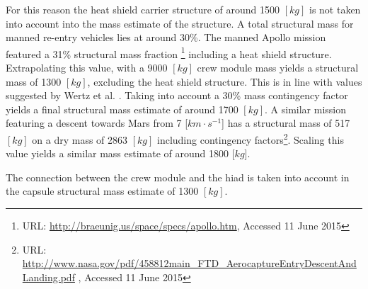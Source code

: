 For this reason the heat shield carrier structure of around 1500 $[kg]$ \cite{Ainsworth2014} is not taken into account into the mass estimate of the structure. A total structural mass for manned re-entry vehicles lies at around 30\%. The manned Apollo mission featured a 31\% structural mass fraction \footnote{URL: \url{http://braeunig.us/space/specs/apollo.htm}, Accessed 11 June 2015} including a heat shield structure. Extrapolating this value, with a 9000 $[kg]$ crew module mass yields a structural mass of 1300 $[kg]$, excluding the heat shield structure. This is in line with values suggested by Wertz et al. \cite{Wertz2011}. Taking into account a 30\% mass contingency factor yields a final structural mass estimate of around 1700 $[kg]$. A similar mission featuring a descent towards Mars from 7 [$km \cdot s^{-1}$] has a structural mass of 517 $[kg]$ on a dry mass of 2863 $[kg]$ including contingency factors\footnote{URL: \url{http://www.nasa.gov/pdf/458812main\_FTD\_AerocaptureEntryDescentAndLanding.pdf} , Accessed 11 June 2015 }. Scaling this value yields a similar mass estimate of around 1800 [$kg$]. 

The connection between the crew module and the \gls{hiad} is taken into account in the capsule structural mass estimate of 1300 $[kg]$. 